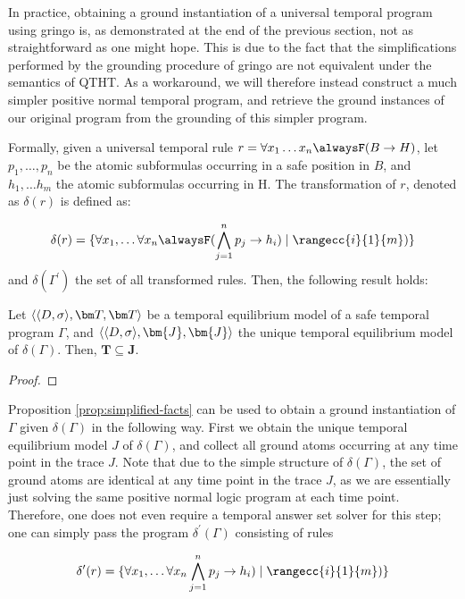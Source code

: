 In practice, obtaining a ground instantiation of a universal temporal
program using gringo is, as demonstrated at the end of the previous
section, not as straightforward as one might hope. This is due to the
fact that the simplifications performed by the grounding procedure of
gringo are not equivalent under the semantics of QTHT. As a
workaround, we will therefore instead construct a much simpler
positive normal temporal program, and retrieve the ground instances of
our original program from the grounding of this simpler program.

Formally, given a universal temporal rule
$r=\forall x_1 \dots x_n \alwaysF(B \rightarrow H)$, let
$p_1,\dots, p_n$ be the atomic subformulas occurring in a safe
position in $B$, and $h_1, \dots h_m$ the atomic subformulas occurring
in H. The transformation of $r$, denoted as $\delta(r)$ is defined as:

\begin{equation*} \delta(r) =\{ \forall x_1, \dots \forall x_n
\alwaysF(\bigwedge_{j=1}^{n}p_j \rightarrow h_i) \mid
\rangecc{i}{1}{m})\}
\end{equation*}
and $\delta (\Gamma^{\prime})$ the set of all transformed rules. Then, the
following result holds:

\begin{proposition}\label{prop:simplified-facts}
  Let $\qttandt$ be a temporal equilibrium model of a safe temporal
  program $\Gamma$, and $\langle \dsigma, \bm{J},\bm{J} \rangle$ the
  unique temporal equilibrium model of $\delta(\Gamma)$. Then,
  $\bm{T} \subseteq \bm{J}$.
\end{proposition}
\begin{proof}
  
\end{proof}

Proposition \ref{prop:simplified-facts} can be used to obtain a ground
instantiation of $\Gamma$ given $\delta(\Gamma)$ in the following
way. First we obtain the unique temporal equilibrium model $J$ of
$\delta(\Gamma)$, and collect all ground atoms occurring at any time
point in the trace $J$. Note that due to the simple structure of
$\delta(\Gamma)$, the set of ground atoms are identical at any time
point in the trace $J$, as we are essentially just solving the same
positive normal logic program at each time point. Therefore, one does not
even require a temporal answer set solver for this step; one can
simply pass the program $\delta^{\prime}(\Gamma)$ consisting of rules

\begin{equation*} \delta^{\prime}(r) =\{ \forall x_1, \dots \forall x_n
  \bigwedge_{j=1}^{n}p_j \rightarrow h_i) \mid \rangecc{i}{1}{m})\}
\end{equation*}

